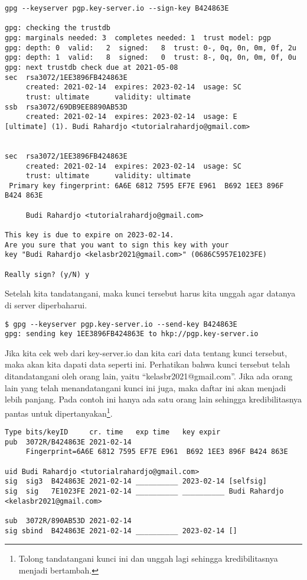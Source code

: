 \begin{verbatim}
gpg --keyserver pgp.key-server.io --sign-key B424863E

gpg: checking the trustdb
gpg: marginals needed: 3  completes needed: 1  trust model: pgp
gpg: depth: 0  valid:   2  signed:   8  trust: 0-, 0q, 0n, 0m, 0f, 2u
gpg: depth: 1  valid:   8  signed:   0  trust: 8-, 0q, 0n, 0m, 0f, 0u
gpg: next trustdb check due at 2021-05-08
sec  rsa3072/1EE3896FB424863E
     created: 2021-02-14  expires: 2023-02-14  usage: SC  
     trust: ultimate      validity: ultimate
ssb  rsa3072/69DB9EE8890AB53D
     created: 2021-02-14  expires: 2023-02-14  usage: E   
[ultimate] (1). Budi Rahardjo <tutorialrahardjo@gmail.com>


sec  rsa3072/1EE3896FB424863E
     created: 2021-02-14  expires: 2023-02-14  usage: SC  
     trust: ultimate      validity: ultimate
 Primary key fingerprint: 6A6E 6812 7595 EF7E E961  B692 1EE3 896F B424 863E

     Budi Rahardjo <tutorialrahardjo@gmail.com>

This key is due to expire on 2023-02-14.
Are you sure that you want to sign this key with your
key "Budi Rahardjo <kelasbr2021@gmail.com>" (0686C5957E1023FE)

Really sign? (y/N) y
\end{verbatim}

Setelah kita tandatangani, maka kunci tersebut harus kita unggah agar
datanya di server diperbaharui.

\begin{verbatim}
$ gpg --keyserver pgp.key-server.io --send-key B424863E
gpg: sending key 1EE3896FB424863E to hkp://pgp.key-server.io
\end{verbatim}

Jika kita cek web dari key-server.io dan kita cari data tentang kunci tersebut,
maka akan kita dapati data seperti ini. Perhatikan bahwa kunci tersebut
telah ditandatangani oleh orang lain, yaitu ``kelasbr2021@gmail.com''.
Jika ada orang lain yang telah menandatangani kunci ini juga, maka daftar
ini akan menjadi lebih panjang.
Pada contoh ini hanya ada satu orang lain sehingga kredibilitasnya pantas
untuk dipertanyakan\footnote{Tolong tandatangani kunci ini dan unggah lagi
sehingga kredibilitasnya menjadi bertambah.}.

\begin{verbatim}
Type bits/keyID     cr. time   exp time   key expir
pub  3072R/B424863E 2021-02-14            
	 Fingerprint=6A6E 6812 7595 EF7E E961  B692 1EE3 896F B424 863E 

uid Budi Rahardjo <tutorialrahardjo@gmail.com>
sig  sig3  B424863E 2021-02-14 __________ 2023-02-14 [selfsig]
sig  sig   7E1023FE 2021-02-14 __________ __________ Budi Rahardjo <kelasbr2021@gmail.com>

sub  3072R/890AB53D 2021-02-14            
sig sbind  B424863E 2021-02-14 __________ 2023-02-14 []
\end{verbatim}

